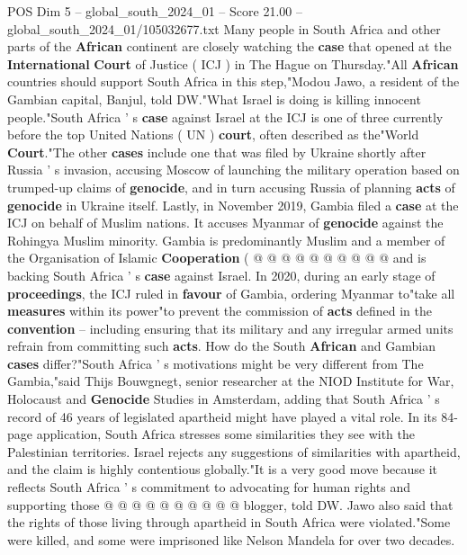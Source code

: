 \begin{textsample}{POS Dim 5 – global\_south\_2024\_01 – Score 21.00 – global\_south\_2024\_01/105032677.txt}  \label{ex:f5_pos_009}
Many people in South Africa and other parts of the \textbf{African} continent are closely watching the \textbf{case} that opened at the \textbf{International} \textbf{Court} of Justice ( ICJ ) in The Hague on Thursday."All \textbf{African} countries should support South Africa in this step,"Modou Jawo, a resident of the Gambian capital, Banjul, told DW."What Israel is doing is killing innocent people."South Africa ' s \textbf{case} against Israel at the ICJ is one of three currently before the top United Nations ( UN ) \textbf{court}, often described as the"World \textbf{Court}."The other \textbf{cases} include one that was filed by Ukraine shortly after Russia ' s invasion, accusing Moscow of launching the military operation based on trumped-up claims of \textbf{genocide}, and in turn accusing Russia of planning \textbf{acts} of \textbf{genocide} in Ukraine itself.
Lastly, in November 2019, Gambia filed a \textbf{case} at the ICJ on behalf of Muslim nations.
It accuses Myanmar of \textbf{genocide} against the Rohingya Muslim minority.
Gambia is predominantly Muslim and a member of the Organisation of Islamic \textbf{Cooperation} ( @ @ @ @ @ @ @ @ @ @ and is backing South Africa ' s \textbf{case} against Israel.
In 2020, during an early stage of \textbf{proceedings}, the ICJ ruled in \textbf{favour} of Gambia, ordering Myanmar to"take all \textbf{measures} within its power"to prevent the commission of \textbf{acts} defined in the \textbf{convention} -- including ensuring that its military and any irregular armed units refrain from committing such \textbf{acts}.
How do the South \textbf{African} and Gambian \textbf{cases} differ?"South Africa ' s motivations might be very different from The Gambia,"said Thijs Bouwgnegt, senior researcher at the NIOD Institute for War, Holocaust and \textbf{Genocide} Studies in Amsterdam, adding that South Africa ' s record of 46 years of legislated apartheid might have played a vital role.
In its 84-page application, South Africa stresses some similarities they see with the Palestinian territories.
Israel rejects any suggestions of similarities with apartheid, and the claim is highly contentious globally."It is a very good move because it reflects South Africa ' s commitment to advocating for human rights and supporting those @ @ @ @ @ @ @ @ @ @ blogger, told DW.
Jawo also said that the rights of those living through apartheid in South Africa were violated."Some were killed, and some were imprisoned like Nelson Mandela for over two decades.

\end{textsample}
